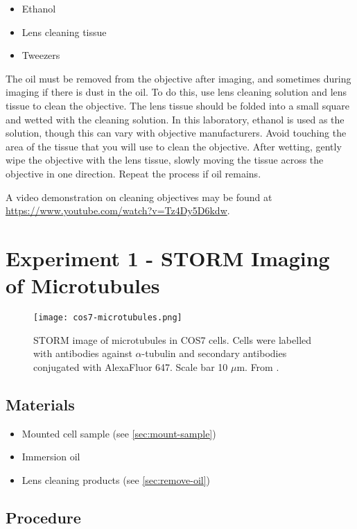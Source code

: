 \documentclass[10pt,a4paper,oneside]{book}
\begin{document}
\begin{itemize}
    \item{Ethanol}
    \item{Lens cleaning tissue}
    \item{Tweezers}
\end{itemize}

The oil must be removed from the objective after imaging, and sometimes during imaging if there is dust in the oil. To do this, use lens cleaning solution and lens tissue to clean the objective. The lens tissue should be folded into a small square and wetted with the cleaning solution. In this laboratory, ethanol is used as the solution, though this can vary with objective manufacturers. Avoid touching the area of the tissue that you will use to clean the objective. After wetting, gently wipe the objective with the lens tissue, slowly moving the tissue across the objective in one direction. Repeat the process if oil remains.

A video demonstration on cleaning objectives may be found at \url{https://www.youtube.com/watch?v=Tz4Dy5D6kdw}.

\section{Experiment 1 - STORM Imaging of Microtubules}\label{sec:exp1}

\begin{figure}[ht]
    \centering
    \texttt{[image: cos7-microtubules.png]}
    \caption{STORM image of microtubules in COS7 cells. Cells were labelled with antibodies against $\alpha$-tubulin and secondary antibodies conjugated with AlexaFluor 647. Scale bar 10 $\mu$m. From \cite{douglass-naturephotonics-2016}.}
    \label{fig:cos7-microtubules}
\end{figure}

\subsection{Materials}

\begin{itemize}
    \item{Mounted cell sample (see \autoref{sec:mount-sample})}
    \item{Immersion oil}
    \item{Lens cleaning products (see \autoref{sec:remove-oil})}
\end{itemize}

\subsection{Procedure}
\end{document}
